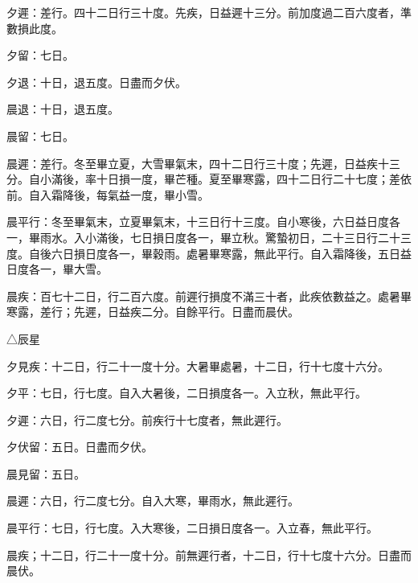 \begin{pinyinscope}
 夕遲：差行。四十二日行三十度。先疾，日益遲十三分。前加度過二百六度者，準數損此度。



 夕留：七日。



 夕退：十日，退五度。日盡而夕伏。



 晨退：十日，退五度。



 晨留：七日。



 晨遲：差行。冬至畢立夏，大雪畢氣末，四十二日行三十度；先遲，日益疾十三分。自小滿後，率十日損一度，畢芒種。夏至畢寒露，四十二日行二十七度；差依前。自入霜降後，每氣益一度，畢小雪。



 晨平行：冬至畢氣末，立夏畢氣末，十三日行十三度。自小寒後，六日益日度各一，畢雨水。入小滿後，七日損日度各一，畢立秋。驚蟄初日，二十三日行二十三度。自後六日損日度各一，畢穀雨。處暑畢寒露，無此平行。自入霜降後，五日益日度各一，畢大雪。



 晨疾：百七十二日，行二百六度。前遲行損度不滿三十者，此疾依數益之。處暑畢寒露，差行；先遲，日益疾二分。自餘平行。日盡而晨伏。



 △辰星



 夕見疾：十二日，行二十一度十分。大暑畢處暑，十二日，行十七度十六分。



 夕平：七日，行七度。自入大暑後，二日損度各一。入立秋，無此平行。



 夕遲：六日，行二度七分。前疾行十七度者，無此遲行。



 夕伏留：五日。日盡而夕伏。



 晨見留：五日。



 晨遲：六日，行二度七分。自入大寒，畢雨水，無此遲行。



 晨平行：七日，行七度。入大寒後，二日損日度各一。入立春，無此平行。



 晨疾；十二日，行二十一度十分。前無遲行者，十二日，行十七度十六分。日盡而晨伏。



\end{pinyinscope}